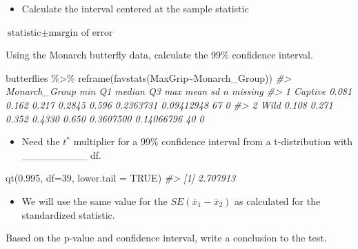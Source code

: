 \documentclass[
]{report}
\newenvironment{Shaded}{\begin{snugshade}}{\end{snugshade}}
\newcommand{\AttributeTok}[1]{\textcolor[rgb]{0.77,0.63,0.00}{#1}}
\newcommand{\CommentTok}[1]{\textcolor[rgb]{0.56,0.35,0.01}{\textit{#1}}}
\newcommand{\ConstantTok}[1]{\textcolor[rgb]{0.00,0.00,0.00}{#1}}
\newcommand{\DecValTok}[1]{\textcolor[rgb]{0.00,0.00,0.81}{#1}}
\newcommand{\FloatTok}[1]{\textcolor[rgb]{0.00,0.00,0.81}{#1}}
\newcommand{\FunctionTok}[1]{\textcolor[rgb]{0.00,0.00,0.00}{#1}}
\newcommand{\NormalTok}[1]{#1}
\newcommand{\SpecialCharTok}[1]{\textcolor[rgb]{0.00,0.00,0.00}{#1}}
\providecommand{\tightlist}{%
  \setlength{\itemsep}{0pt}\setlength{\parskip}{0pt}}
\newcommand{\rgi}{\hspace{24pt}}  %
\begin{document}
\begin{itemize}
\tightlist
\item
  Calculate the interval centered at the sample statistic
\end{itemize}

\rgi \(\text{statistic} \pm \text{margin of error}\)

\vspace{0.8in}

Using the Monarch butterfly data, calculate the 99\% confidence interval.

\begin{Shaded}
\begin{Highlighting}[]
\NormalTok{butterflies }\SpecialCharTok{\%\textgreater{}\%}
    \FunctionTok{reframe}\NormalTok{(}\FunctionTok{favstats}\NormalTok{(MaxGrip}\SpecialCharTok{\textasciitilde{}}\NormalTok{Monarch\_Group))}
\CommentTok{\#\textgreater{}   Monarch\_Group   min    Q1 median     Q3   max      mean         sd  n missing}
\CommentTok{\#\textgreater{} 1       Captive 0.081 0.162  0.217 0.2845 0.596 0.2363731 0.09412948 67       0}
\CommentTok{\#\textgreater{} 2          Wild 0.108 0.271  0.352 0.4330 0.650 0.3607500 0.14066796 40       0}
\end{Highlighting}
\end{Shaded}

\begin{itemize}
\tightlist
\item
  Need the \(t^*\) multiplier for a 99\% confidence interval from a t-distribution with \_\_\_\_\_\_\_\_\_ df.
\end{itemize}

\begin{Shaded}
\begin{Highlighting}[]
\FunctionTok{qt}\NormalTok{(}\FloatTok{0.995}\NormalTok{, }\AttributeTok{df=}\DecValTok{39}\NormalTok{, }\AttributeTok{lower.tail =} \ConstantTok{TRUE}\NormalTok{)}
\CommentTok{\#\textgreater{} [1] 2.707913}
\end{Highlighting}
\end{Shaded}

\begin{itemize}
\tightlist
\item
  We will use the same value for the \(SE(\bar{x}_1-\bar{x}_2)\) as calculated for the standardized statistic.
\end{itemize}

\vspace{1in}

Based on the p-value and confidence interval, write a conclusion to the test.
\end{document}
